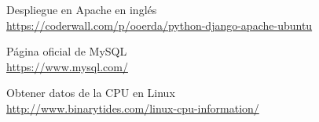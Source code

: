 \begin{thebibliography}{25}
Despliegue en Apache en inglés  \\
{\footnotesize
\url{https://coderwall.com/p/ooerda/python-django-apache-ubuntu}}

Página oficial de MySQL  \\
{\footnotesize
\url{https://www.mysql.com/}} 

Obtener datos de la CPU en Linux  \\
{\footnotesize
\url{http://www.binarytides.com/linux-cpu-information/}}





\end{thebibliography}